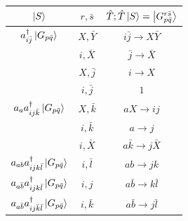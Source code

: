 \documentclass[./thesis.tex]{subfiles}
\begin{document}
\begin{table}
\begin{center}
\begin{tabular}{ c|c|c }
                \hline \hline \rule{0pt}{3ex}
                $\ket S$                                                                        &$ r, \bar s$   & $\hat T ; \hat T \ket S = \ket {G_{p \bar q}^{r \bar s}}$     \\
                \hline \hline \rule{0pt}{3ex}
                $a^\dagger_{i \bar j} \ket {G_{p \bar q}}$                          & $X, \bar Y$   &$i \bar j \rightarrow X \bar Y$                \\
                                                                                        & $i,\bar X$            &$\bar j \rightarrow \bar X$            \\
                                                                                        & $X,\bar j$    &$i \rightarrow X$              \\
                                                                                        & $i,\bar j$    &$1$                    \\
                                                                                        
                                                                                        
                \hline \rule{0pt}{3ex}
                $a_{a} a^\dagger_{ij \bar k} \ket {G_{p \bar q}}$           &$X,\bar k$             &$aX \rightarrow ij$            \\
                                                                                        &$i,\bar k$             &$a \rightarrow j$              \\
                                                                                        &$i,\bar X$             &$a \bar k \rightarrow j \bar X$                \\
                                                                                        
                \hline \rule{0pt}{3ex}
                $a_{ab} a^\dagger_{ijk \bar l} \ket {G_{p \bar q}}$                       &$i,\bar l$             &$ab \rightarrow jk$            \\
                \hline \rule{0pt}{3ex}
                $a_{a  \bar b} a^\dagger_{ijk \bar l} \ket {G_{p \bar q}}$                        &$i,j$          &$a \bar b \rightarrow k \bar l$                \\
                \hline \rule{0pt}{3ex}
                $a_{a  \bar b} a^\dagger_{ij \bar k \bar l} \ket {G_{p \bar q}}$                  &$i,\bar k$             &$a \bar b \rightarrow j \bar l$                \\
        \end{tabular}
        

\end{center}
\end{table}
\end{document}
